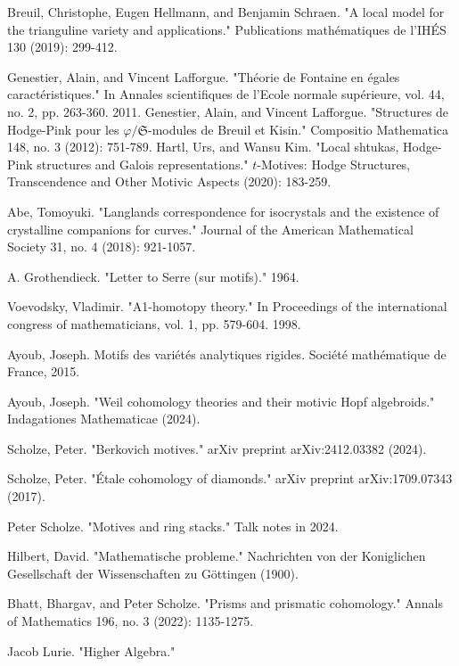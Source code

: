 \documentclass[12pt]{article}
\theoremstyle{definition}
\begin{document}
\begin{thebibliography}{}
 Breuil, Christophe, Eugen Hellmann, and Benjamin Schraen. "A local model for the trianguline variety and applications." Publications math\'ematiques de l'IH\'ES 130 (2019): 299-412.

 Genestier, Alain, and Vincent Lafforgue. "Th\'eorie de Fontaine en \'egales caract\'eristiques." In Annales scientifiques de l'Ecole normale sup\'erieure, vol. 44, no. 2, pp. 263-360. 2011.
 Genestier, Alain, and Vincent Lafforgue. "Structures de Hodge-Pink pour les $\varphi/\mathfrak{S}$-modules de Breuil et Kisin." Compositio Mathematica 148, no. 3 (2012): 751-789.
 Hartl, Urs, and Wansu Kim. "Local shtukas, Hodge-Pink structures and Galois representations." $ t $-Motives: Hodge Structures, Transcendence and Other Motivic Aspects (2020): 183-259.

 Abe, Tomoyuki. "Langlands correspondence for isocrystals and the existence of crystalline companions for curves." Journal of the American Mathematical Society 31, no. 4 (2018): 921-1057.


 A. Grothendieck. "Letter to Serre (sur motifs)." 1964.

 Voevodsky, Vladimir. "A1-homotopy theory." In Proceedings of the international congress of mathematicians, vol. 1, pp. 579-604. 1998.

 Ayoub, Joseph. Motifs des vari\'et\'es analytiques rigides. Soci\'et\'e math\'ematique de France, 2015.

 Ayoub, Joseph. "Weil cohomology theories and their motivic Hopf algebroids." Indagationes Mathematicae (2024).

 Scholze, Peter. "Berkovich motives." arXiv preprint arXiv:2412.03382 (2024).

 Scholze, Peter. "\'Etale cohomology of diamonds." arXiv preprint arXiv:1709.07343 (2017).

 Peter Scholze. "Motives and ring stacks." Talk notes in 2024.

 Hilbert, David. "Mathematische probleme." Nachrichten von der Koniglichen Gesellschaft der Wissenschaften zu G\"ottingen (1900).

 Bhatt, Bhargav, and Peter Scholze. "Prisms and prismatic cohomology." Annals of Mathematics 196, no. 3 (2022): 1135-1275.

 Jacob Lurie. "Higher Algebra."


\end{thebibliography}
\end{document}
